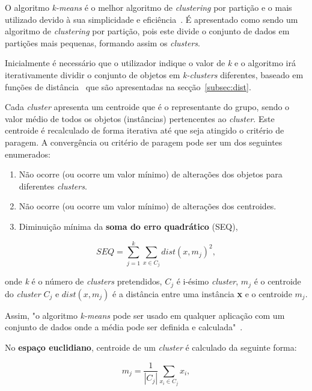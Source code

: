 O algoritmo \textit{k-means} é o melhor algoritmo de \textit{clustering} por partição e o mais utilizado devido à sua simplicidade e eficiência~\citet{Liu2011}. É apresentado como  sendo  um algoritmo de \textit{clustering} por partição, pois este divide o conjunto de dados em partições mais pequenas, formando assim os \textit{clusters}.

Inicialmente é necessário que o utilizador indique o valor de \textit{k} e o algoritmo irá iterativamente dividir o conjunto de objetos em \textit{k-clusters} diferentes, baseado em funções de distância~\citet{Liu2011} que são apresentadas na secção~\ref{subsec:dist}.

Cada \textit{cluster} apresenta um centroide que é o representante do grupo, sendo o valor médio de todos os objetos (instâncias) pertencentes ao \textit{cluster}. Este centroide é recalculado de forma iterativa até que seja atingido o critério de paragem. A convergência ou critério de paragem pode ser um dos seguintes enumerados:

\begin{enumerate}
\item Não ocorre (ou ocorre um valor mínimo) de alterações dos objetos para diferentes \textit{clusters}.
\item Não ocorre (ou ocorre um valor mínimo) de alterações dos centroides.
\item Diminuição mínima da \textbf{soma do erro quadrático} (SEQ),
\end{enumerate}

\begin{equation}
SEQ = \sum_{j=1}^{k} \sum_{x \in C_{j} } dist(x, m_{j})^{2} ,
\end{equation}

onde \textit{k} é o número de \textit{clusters} pretendidos, $ C_{j} $ é i-ésimo \textit{cluster}, $ m_{j} $ é o centroide do \textit{cluster} $ C_{j} $ e $ dist(x, m_{j}) $ é a distância entre uma instância \textbf{x} e o centroide $ m_{j} $.

Assim, "o algoritmo \textit{k-means} pode ser usado em qualquer aplicação com um conjunto de dados onde a média pode ser definida e calculada"~\citet{Liu2011}.

No \textbf{espaço euclidiano}, centroide de um \textit{cluster} é calculado da seguinte forma:

\begin{equation}
m_{j} =  \frac{1}{|C_{j}|} \sum_{x_{i} \in C_{j} }x_{i} ,
\end{equation}

